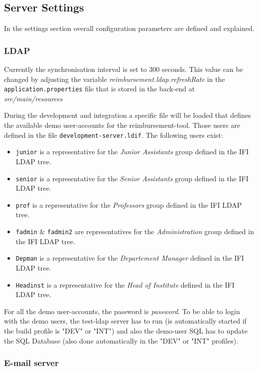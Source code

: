 \subsection{Server Settings}
In the settings section overall configuration parameters are defined and explained.

\subsubsection{LDAP}
\label{subsubsec:ldap}

Currently the synchronisation interval is set to 300 seconds. This value can be changed by adjusting the variable \textit{reimbursement.ldap.refreshRate} in the \texttt{application.properties} file that is stored in the back-end at \textit{src/main/resources} \par
During the development and integration a specific file will be loaded that defines the available demo user-accounts for the reimbursement-tool. Those users are defined in the file \texttt{development-server.ldif}. The following users exist:
\begin{itemize}
\item \texttt{junior} is a representative for the \textit{Junior Assistants} group defined in the IFI LDAP tree.
\item \texttt{senior} is a representative for the \textit{Senior Assistants} group defined in the IFI LDAP tree.
\item \texttt{prof} is a representative for the \textit{Professors} group defined in the IFI LDAP tree.
\item \texttt{fadmin} \& \texttt{fadmin2} are representatives for the \textit{Administration} group defined in the IFI LDAP tree.
\item \texttt{Depman} is a representative for the \textit{Departement Manager} defined in the IFI LDAP tree.
\item \texttt{Headinst} is a representative for the \textit{Head of Institute} defined in the IFI LDAP tree.

\end{itemize}

For all the demo user-accounts, the password is \textit{password}. To be able to login with the demo users, the test-ldap server has to run (is automatically started if the build profile is "DEV" or "INT") and also the demo-user SQL has to update the SQL Database (also done automatically in the "DEV" or "INT" profiles).

\subsubsection{E-mail server}
\label{subsubsec:email}

